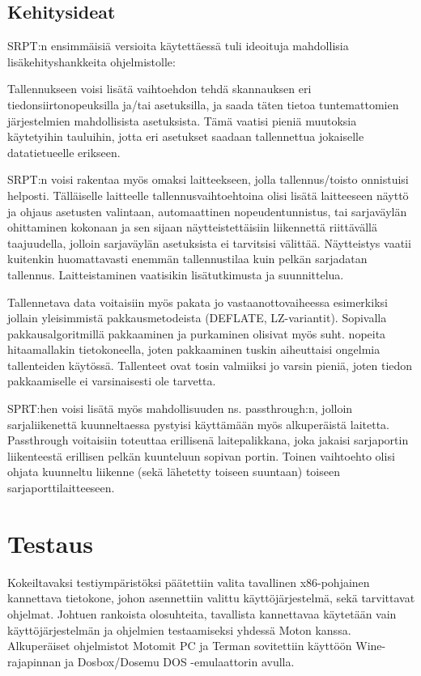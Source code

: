 \subsection{Kehitysideat}

SRPT:n ensimmäisiä versioita käytettäessä tuli ideoituja mahdollisia lisäkehityshankkeita ohjelmistolle:

Tallennukseen voisi lisätä vaihtoehdon tehdä skannauksen eri tiedonsiirtonopeuksilla ja/tai asetuksilla, ja saada täten tietoa tuntemattomien järjestelmien mahdollisista asetuksista. Tämä vaatisi pieniä muutoksia käytetyihin tauluihin, jotta eri asetukset saadaan tallennettua jokaiselle datatietueelle erikseen.

SRPT:n voisi rakentaa myös omaksi laitteekseen, jolla tallennus/toisto onnistuisi helposti. Tälläiselle laitteelle tallennusvaihtoehtoina olisi lisätä laitteeseen näyttö ja ohjaus asetusten valintaan, automaattinen nopeudentunnistus, tai sarjaväylän ohittaminen kokonaan ja sen sijaan näytteistettäisiin liikennettä riittävällä taajuudella, jolloin sarjaväylän asetuksista ei tarvitsisi välittää. Näytteistys vaatii kuitenkin huomattavasti enemmän tallennustilaa kuin pelkän sarjadatan tallennus. Laitteistaminen vaatisikin lisätutkimusta ja suunnittelua.

Tallennetava data voitaisiin myös pakata jo vastaanottovaiheessa esimerkiksi jollain yleisimmistä pakkausmetodeista (DEFLATE, LZ-variantit). Sopivalla pakkausalgoritmillä pakkaaminen ja purkaminen olisivat myös suht. nopeita hitaamallakin tietokoneella, joten pakkaaminen tuskin aiheuttaisi ongelmia tallenteiden käytössä. Tallenteet ovat tosin valmiiksi jo varsin pieniä, joten tiedon pakkaamiselle ei varsinaisesti ole tarvetta.

SPRT:hen voisi lisätä myös mahdollisuuden ns. passthrough:n, jolloin sarjaliikenettä kuunneltaessa pystyisi käyttämään myös alkuperäistä laitetta. Passthrough voitaisiin toteuttaa erillisenä laitepalikkana, joka jakaisi sarjaportin liikenteestä erillisen pelkän kuunteluun sopivan portin. Toinen vaihtoehto olisi ohjata kuunneltu liikenne (sekä lähetetty toiseen suuntaan) toiseen sarjaporttilaitteeseen.

\section{Testaus}

Kokeiltavaksi testiympäristöksi päätettiin valita tavallinen x86-pohjainen kannettava tietokone, johon asennettiin valittu käyttöjärjestelmä, sekä tarvittavat ohjelmat. Johtuen rankoista olosuhteita, tavallista kannettavaa käytetään vain käyttöjärjestelmän ja ohjelmien testaamiseksi yhdessä Moton kanssa. Alkuperäiset ohjelmistot Motomit PC ja Terman sovitettiin käyttöön Wine-rajapinnan ja Dosbox/Dosemu DOS -emulaattorin avulla.

